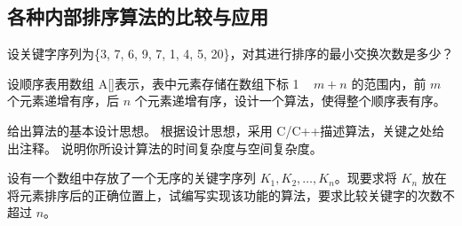 \subsection{各种内部排序算法的比较与应用}

\begin{qitems}
    \begin{bbox}
        \qitem 设关键字序列为\{3, 7, 6, 9, 7, 1, 4, 5, 20\}，对其进行排序的最小交换次数是多少？
    \end{bbox}
    \begin{bbox}
        \qitem 设顺序表用数组 A[]表示，表中元素存储在数组下标 1 ~ $m+n$ 的范围内，前 $m$ 个元素递增有序，后 $n$ 个元素递增有序，设计一个算法，使得整个顺序表有序。
        \begin{subqitems}
            \subqitem 给出算法的基本设计思想。
            \subqitem 根据设计思想，采用 C/C++描述算法，关键之处给出注释。
            \subqitem 说明你所设计算法的时间复杂度与空间复杂度。
        \end{subqitems}
    \end{bbox}
    \begin{bbox}
        \qitem 设有一个数组中存放了一个无序的关键字序列 $K_1, K_2, \dots, K_n$。现要求将 $K_n$ 放在将元素排序后的正确位置上，试编写实现该功能的算法，要求比较关键字的次数不超过 $n$。
    \end{bbox}
\end{qitems} 